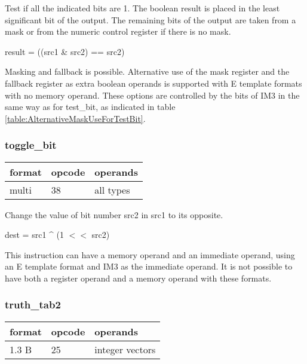 \documentclass[forwardcom.tex]{subfiles}
\begin{document}
Test if all the indicated bits are 1.
The boolean result is placed in the least significant bit of the output. The remaining bits of the output are taken from a mask or from the numeric control register if there is no mask.
\vspace{2mm}

result = ((src1 \& src2) == src2)

\vspace{2mm}
Masking and fallback is possible. Alternative use of the mask register and the fallback register as extra boolean operands is supported with E template formats with no memory operand. These options are controlled by the bits of IM3 in the same way as for test\_bit, as indicated in table \ref{table:AlternativeMaskUseForTestBit}.

\subsubsection{toggle\_bit}
\label{table:toggleBitInstruction}
\begin{tabular}{|p{12mm}|p{12mm}|p{110mm}|}
\hline
\bfseries format & \bfseries opcode & \bfseries operands \\ \hline
multi & 38 & all types \\ \hline
\end{tabular}
\vspace{2mm}

Change the value of bit number src2 in src1 to its opposite.
\vspace{2mm}

dest = src1 \^{} (1 $<<$ src2)

\vspace{2mm}
This instruction can have a memory operand and an immediate operand, using an E template format and IM3  as the immediate operand. It is not possible to have both a register operand and a memory operand with these formats.
\vspace{2mm}


\subsubsection{truth\_tab2}
\label{table:truthTab2Instruction}
\begin{tabular}{|p{12mm}|p{12mm}|p{110mm}|}
\hline
\bfseries format & \bfseries opcode & \bfseries operands \\ \hline
1.3 B & 25 & integer vectors \\ \hline
\end{tabular}
\vspace{2mm}
\end{document}
